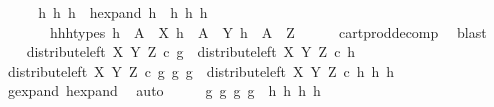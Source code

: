\begin{isabellebody}
\ \ \isamarkupfalse%
\ \isamarkupfalse%
\ h{}\ h{}\ h{}\ \ h{\isacharunderscore}{\kern0pt}expand{\isacharcolon}{\kern0pt}\ {\isachardoublequoteopen}h\ {\isacharequal}{\kern0pt}\ {\isasymlangle}h{}{\isacharcomma}{\kern0pt}\ {\isasymlangle}h{}{\isacharcomma}{\kern0pt}\ h{}{\isasymrangle}{\isasymrangle}{\isachardoublequoteclose}\isanewline
\ \ \ \ \ \ \ h{}{\isacharunderscore}{\kern0pt}h{}{\isacharunderscore}{\kern0pt}h{}{\isacharunderscore}{\kern0pt}types{\isacharcolon}{\kern0pt}\ {\isachardoublequoteopen}h{}\ {\isacharcolon}{\kern0pt}\ A\ {\isasymrightarrow}\ X{\isachardoublequoteclose}\ {\isachardoublequoteopen}h{}\ {\isacharcolon}{\kern0pt}\ A\ {\isasymrightarrow}\ Y{\isachardoublequoteclose}\ {\isachardoublequoteopen}h{}\ {\isacharcolon}{\kern0pt}\ A\ {\isasymrightarrow}\ Z{\isachardoublequoteclose}\isanewline
\ \ \ \ \isamarkupfalse%
\ cart{\isacharunderscore}{\kern0pt}prod{\isacharunderscore}{\kern0pt}decomp\ \isamarkupfalse%
\ blast\ \isanewline
\isanewline
\ \ \isamarkupfalse%
\ {\isachardoublequoteopen}distribute{\isacharunderscore}{\kern0pt}left\ X\ Y\ Z\ {\isasymcirc}\isactrlsub c\ g\ {\isacharequal}{\kern0pt}\ distribute{\isacharunderscore}{\kern0pt}left\ X\ Y\ Z\ {\isasymcirc}\isactrlsub c\ h{\isachardoublequoteclose}\isanewline
\ \ \isamarkupfalse%
\ \isamarkupfalse%
\ {\isachardoublequoteopen}distribute{\isacharunderscore}{\kern0pt}left\ X\ Y\ Z\ {\isasymcirc}\isactrlsub c\ {\isasymlangle}g{}{\isacharcomma}{\kern0pt}\ {\isasymlangle}g{}{\isacharcomma}{\kern0pt}\ g{}{\isasymrangle}{\isasymrangle}\ {\isacharequal}{\kern0pt}\ distribute{\isacharunderscore}{\kern0pt}left\ X\ Y\ Z\ {\isasymcirc}\isactrlsub c\ {\isasymlangle}h{}{\isacharcomma}{\kern0pt}\ {\isasymlangle}h{}{\isacharcomma}{\kern0pt}\ h{}{\isasymrangle}{\isasymrangle}{\isachardoublequoteclose}\isanewline
\ \ \ \ \isamarkupfalse%
\ g{\isacharunderscore}{\kern0pt}expand\ h{\isacharunderscore}{\kern0pt}expand\ \isamarkupfalse%
\ auto\isanewline
\ \ \isamarkupfalse%
\ \isamarkupfalse%
\ {\isachardoublequoteopen}{\isasymlangle}{\isasymlangle}g{}{\isacharcomma}{\kern0pt}\ g{}{\isasymrangle}{\isacharcomma}{\kern0pt}\ {\isasymlangle}g{}{\isacharcomma}{\kern0pt}\ g{}{\isasymrangle}{\isasymrangle}\ {\isacharequal}{\kern0pt}\ {\isasymlangle}{\isasymlangle}h{}{\isacharcomma}{\kern0pt}\ h{}{\isasymrangle}{\isacharcomma}{\kern0pt}\ {\isasymlangle}h{}{\isacharcomma}{\kern0pt}\ h{}{\isasymrangle}{\isasymrangle}{\isachardoublequoteclose}\isanewline

\end{isabellebody}
